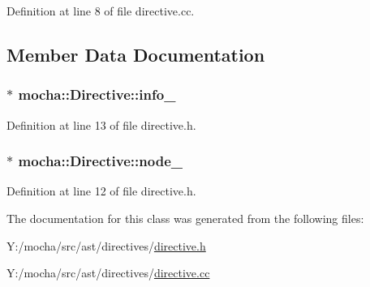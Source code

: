 Definition at line 8 of file directive.cc.



\subsection{Member Data Documentation}
\hypertarget{classmocha_1_1_directive_ae14798b3b58438e68d013c881eb17e6a}{
\subsubsection[{info\_\-}]{$\ast$ {\bf mocha::Directive::info\_\-}}}
\label{classmocha_1_1_directive_ae14798b3b58438e68d013c881eb17e6a}


Definition at line 13 of file directive.h.

\hypertarget{classmocha_1_1_directive_aa2cda5bc28126665c93f88ae11996697}{
\subsubsection[{node\_\-}]{$\ast$ {\bf mocha::Directive::node\_\-}}}
\label{classmocha_1_1_directive_aa2cda5bc28126665c93f88ae11996697}


Definition at line 12 of file directive.h.



The documentation for this class was generated from the following files:\begin{DoxyCompactItemize}
\item 
Y:/mocha/src/ast/directives/\hyperlink{directive_8h}{directive.h}\item 
Y:/mocha/src/ast/directives/\hyperlink{directive_8cc}{directive.cc}\end{DoxyCompactItemize}
